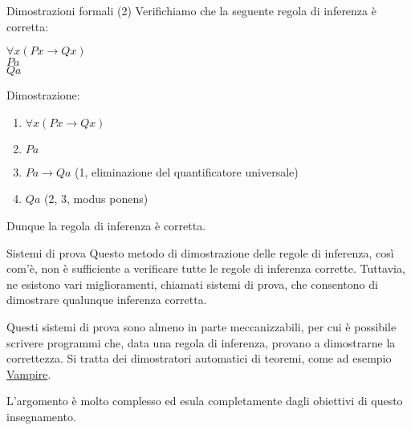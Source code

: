 \documentclass[10pt,dvipsnames,xcolor=table,handout]{beamer}
\begin{document}
\begin{frame}{Dimostrazioni formali (2)}
    Verifichiamo che la seguente regola di inferenza è corretta:
    \begin{center}
        \begin{inference}
            $\forall x (Px \to Qx)$\\
            $Pa$\\
            \hline
            $Qa$
        \end{inference}
    \end{center}
    Dimostrazione:
    \begin{enumerate}
        \item $\forall x (Px \to Qx)$\\
        \item $Pa$\\
        \item $Pa \to Qa$ \hfill (1, eliminazione del quantificatore universale)\\
        \item $Qa$ \hfill (2, 3, modus ponens)
    \end{enumerate}
    Dunque la regola di inferenza è corretta.
\end{frame}

\begin{frame}{Sistemi di prova}
    Questo metodo di dimostrazione delle regole di inferenza, così com'è, non è sufficiente a verificare tutte le regole di inferenza corrette. Tuttavia, ne esistono vari miglioramenti, chiamati \alert{sistemi di prova}, che consentono di dimostrare qualunque inferenza corretta.

    \medskip
    Questi sistemi di prova sono almeno in parte meccanizzabili, per cui è possibile scrivere programmi che, data una regola di inferenza, provano a dimostrarne la correttezza. Si tratta dei \alert{dimostratori automatici di teoremi}, come ad esempio \href{https://vprover.github.io/}{Vampire}.

    \medskip
    L'argomento è molto complesso ed esula completamente dagli obiettivi di questo insegnamento.
\end{frame}
\end{document}
